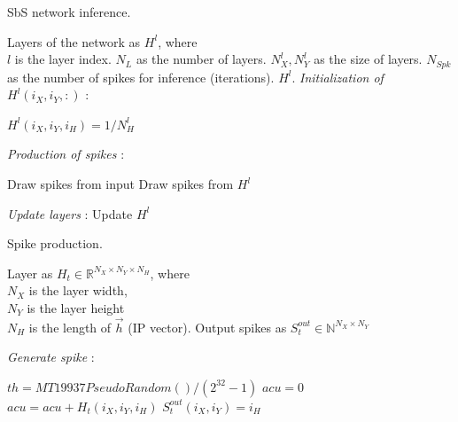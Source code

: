 \begin{algorithm}[t]
	\caption{SbS network inference.} \label{alg:inference}
	
	\begin{algorithmic}[1]
		\SetAlgoLined
		\renewcommand{\algorithmicrequire}{\textbf{input:}}
		\renewcommand{\algorithmicensure}{\textbf{output:}}
		\REQUIRE Layers of the network as $H^l$, where\\
		$l$ is the layer index.
		\REQUIRE $N_{L}$ as the number of layers.
		\REQUIRE $N^l_{X}, N^l_{Y}$ as the size of layers.
		\REQUIRE $N_{Spk}$ as the number of spikes for inference (iterations).
		\ENSURE $H^l$.
		\STATE \textit{Initialization of $H^l(i_X,i_Y,:)$} :
		
		\STATE $H^l(i_X,i_Y,i_{H}) = 1/N^l_H$
		\ENDFOR
		\ENDFOR
		\ENDFOR
		\ENDIF
		
		\textit{Production of spikes} :
		
		\STATE Draw spikes from input 
		\ELSE
		\STATE Draw spikes from $H^l$ 
		\ENDIF
		
		\ENDFOR
		
		\textit{Update layers} :
		\STATE Update $H^l$ 
		\ENDFOR
		
		\ENDFOR
	\end{algorithmic} 
\end{algorithm}


\begin{algorithm}[t]
	\caption{Spike production.} \label{alg:spike}
	
	\begin{algorithmic}[1]
		\SetAlgoLined
		\renewcommand{\algorithmicrequire}{\textbf{input:}}
		\renewcommand{\algorithmicensure}{\textbf{output:}}
		\REQUIRE Layer as $H_t\in\mathbb{R}^{N_X \times N_Y \times N_H}$, where\\
		$N_X$ is the layer width,\\
		$N_Y$ is the layer height\\
		$N_H$ is the length of $\vec{h}$ (IP vector).
		\ENSURE Output spikes as $S_t^{out} \in\mathbb{N}^{N_X \times N_Y}$
		
		
		
		\STATE \textit{Generate spike} :
		
		\STATE $th = MT19937PseudoRandom()/(2^{32}-1)$
		\STATE $acu = 0$
		\STATE $acu = acu + H_t(i_X,i_Y,i_{H})$
		\STATE $S_t^{out}(i_X,i_Y) = i_{H}$
		\ENDIF
		\ENDFOR
		\ENDFOR
	\end{algorithmic} 
\end{algorithm}





